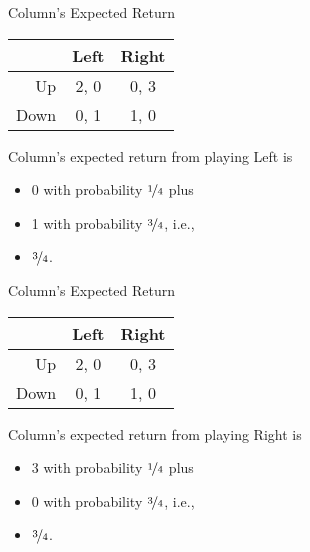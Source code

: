 \documentclass[
  ignorenonframetext,
]{beamer}
\providecommand{\tightlist}{%
  \setlength{\itemsep}{0pt}\setlength{\parskip}{0pt}}
\begin{document}
\begin{frame}{Column's Expected Return}
\protect\hypertarget{columns-expected-return}{}
\begin{table}[!h]
\centering
\begin{tabular}[t]{>{}r|cc}
\toprule
 & Left & Right\\
\midrule
Up & 2, 0 & 0, 3\\
Down & 0, 1 & 1, 0\\
\bottomrule
\end{tabular}
\end{table}

Column's expected return from playing Left is

\begin{itemize}
\tightlist
\item
  0 with probability \(\nicefrac{1}{4}\) plus
\item
  1 with probability \(\nicefrac{3}{4}\), i.e.,
\item
  \(\nicefrac{3}{4}\).
\end{itemize}
\end{frame}

\begin{frame}{Column's Expected Return}
\protect\hypertarget{columns-expected-return-1}{}
\begin{table}[!h]
\centering
\begin{tabular}[t]{>{}r|cc}
\toprule
 & Left & Right\\
\midrule
Up & 2, 0 & 0, 3\\
Down & 0, 1 & 1, 0\\
\bottomrule
\end{tabular}
\end{table}

Column's expected return from playing Right is

\begin{itemize}
\tightlist
\item
  3 with probability \(\nicefrac{1}{4}\) plus
\item
  0 with probability \(\nicefrac{3}{4}\), i.e.,
\item
  \(\nicefrac{3}{4}\).
\end{itemize}
\end{frame}
\end{document}
